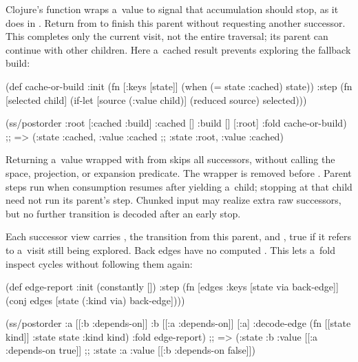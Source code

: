 {Clojure's  function wraps a~value to signal that accumulation
should stop, as it does in . Return
 from  to finish this parent
without requesting another successor. This completes only the current
visit, not the entire traversal; its parent can continue with other children.
Here a~cached result prevents
exploring the fallback build:

\begtt {}
(def cache-or-build
  {:init (fn [{:keys [state]}] (when (= state :cached) state))
   :step (fn [selected child]
           (if-let [source (:value child)]
             (reduced source)
             selected))})

(ss/postorder {:root [:cached :build]
               :cached []
               :build []}
              [:root]
              {:fold cache-or-build})
;; => ({:state :cached, :value :cached}
;;     {:state :root, :value :cached})
\endtt

Returning a~value wrapped with  from  skips all successors,
without calling the space, projection, or expansion predicate.
The wrapper is removed before . Parent steps run when
consumption resumes after yielding a~child; stopping at that child need not
run its parent's step. Chunked input may realize extra raw successors, but
no further transition is decoded after an early stop.

Each successor view carries , the transition from this parent,
and , true if it refers to a~visit still being explored.
Back edges have no computed . This lets a~fold inspect cycles
without following them again:

\begtt {}
(def edge-report
  {:init (constantly [])
   :step (fn [edges {:keys [state via back-edge]}]
           (conj edges [state (:kind via) back-edge]))})

(ss/postorder {:a [[:b :depends-on]]
               :b [[:a :depends-on]]}
              [:a]
              {:decode-edge (fn [[state kind]]
                              {:state state :kind kind})
               :fold edge-report})
;; => ({:state :b :value [[:a :depends-on true]]}
;;     {:state :a :value [[:b :depends-on false]]})
\endtt

}
